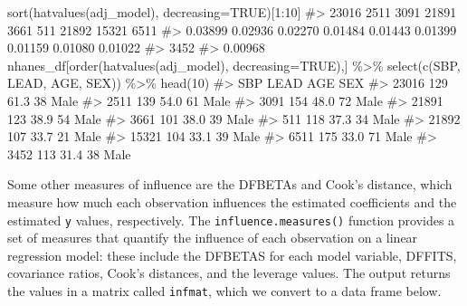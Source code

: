 \documentclass[
  letterpaper,
]{krantz}
\makeatletter
\newenvironment{Shaded}{\begin{snugshade}}{\end{snugshade}}
\newcommand{\AttributeTok}[1]{\textcolor[rgb]{0.40,0.45,0.13}{#1}}
\newcommand{\CommentTok}[1]{\textcolor[rgb]{0.37,0.37,0.37}{#1}}
\newcommand{\ConstantTok}[1]{\textcolor[rgb]{0.56,0.35,0.01}{#1}}
\newcommand{\DecValTok}[1]{\textcolor[rgb]{0.68,0.00,0.00}{#1}}
\newcommand{\FunctionTok}[1]{\textcolor[rgb]{0.28,0.35,0.67}{#1}}
\newcommand{\NormalTok}[1]{\textcolor[rgb]{0.00,0.23,0.31}{#1}}
\newcommand{\SpecialCharTok}[1]{\textcolor[rgb]{0.37,0.37,0.37}{#1}}
\newenvironment{kframe}{%
\medskip{}
\setlength{\fboxsep}{.8em}
 \def\at@end@of@kframe{}%
 \ifinner\ifhmode%
  \def\at@end@of@kframe{\end{minipage}}%
  \begin{minipage}{\columnwidth}%
 \fi\fi%
 \def\FrameCommand##1{\hskip\@totalleftmargin \hskip-\fboxsep
 \colorbox{shadecolor}{##1}\hskip-\fboxsep
     \hskip-\linewidth \hskip-\@totalleftmargin \hskip\columnwidth}%
 \MakeFramed {\advance\hsize-\width
   \@totalleftmargin\z@ \linewidth\hsize
   \@setminipage}}%
 {\par\unskip\endMakeFramed%
 \at@end@of@kframe}
\renewenvironment{Shaded}{\begin{kframe}}{\end{kframe}}
\makeatother
\begin{document}
\begin{Shaded}
\begin{Highlighting}[]
\FunctionTok{sort}\NormalTok{(}\FunctionTok{hatvalues}\NormalTok{(adj\_model), }\AttributeTok{decreasing=}\ConstantTok{TRUE}\NormalTok{)[}\DecValTok{1}\SpecialCharTok{:}\DecValTok{10}\NormalTok{]}
\CommentTok{\#\textgreater{}   23016    2511    3091   21891    3661     511   21892   15321    6511 }
\CommentTok{\#\textgreater{} 0.03899 0.02936 0.02270 0.01484 0.01443 0.01399 0.01159 0.01080 0.01022 }
\CommentTok{\#\textgreater{}    3452 }
\CommentTok{\#\textgreater{} 0.00968}
\NormalTok{nhanes\_df[}\FunctionTok{order}\NormalTok{(}\FunctionTok{hatvalues}\NormalTok{(adj\_model), }\AttributeTok{decreasing=}\ConstantTok{TRUE}\NormalTok{),] }\SpecialCharTok{\%\textgreater{}\%} 
  \FunctionTok{select}\NormalTok{(}\FunctionTok{c}\NormalTok{(SBP, LEAD, AGE, SEX)) }\SpecialCharTok{\%\textgreater{}\%} \FunctionTok{head}\NormalTok{(}\DecValTok{10}\NormalTok{)}
\CommentTok{\#\textgreater{}       SBP LEAD AGE  SEX}
\CommentTok{\#\textgreater{} 23016 129 61.3  38 Male}
\CommentTok{\#\textgreater{} 2511  139 54.0  61 Male}
\CommentTok{\#\textgreater{} 3091  154 48.0  72 Male}
\CommentTok{\#\textgreater{} 21891 123 38.9  54 Male}
\CommentTok{\#\textgreater{} 3661  101 38.0  39 Male}
\CommentTok{\#\textgreater{} 511   118 37.3  34 Male}
\CommentTok{\#\textgreater{} 21892 107 33.7  21 Male}
\CommentTok{\#\textgreater{} 15321 104 33.1  39 Male}
\CommentTok{\#\textgreater{} 6511  175 33.0  71 Male}
\CommentTok{\#\textgreater{} 3452  113 31.4  38 Male}
\end{Highlighting}
\end{Shaded}

Some other measures of influence are the DFBETAs and Cook's distance,
which measure how much each observation influences the estimated
coefficients and the estimated \texttt{y} values, respectively. The
\texttt{influence.measures()} function provides a set of measures that
quantify the influence of each observation on a linear regression model:
these include the DFBETAS for each model variable, DFFITS, covariance
ratios, Cook's distances, and the leverage values. The output returns
the values in a matrix called \texttt{infmat}, which we convert to a
data frame below.
\end{document}
